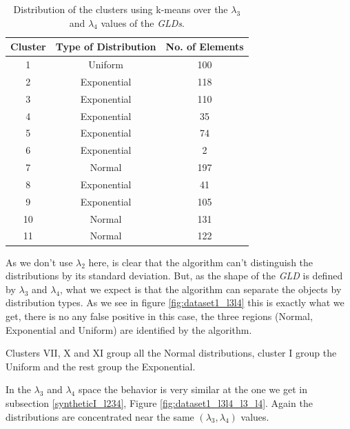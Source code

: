 \begin{table}[]
\centering
\caption{Distribution of the clusters using k-means over the $\lambda_{3}$ and $\lambda_{4}$ values of the \textit{GLDs}.}
\label{tab:dataset1_l3l4}
\begin{tabular}{|c|c|c|}
\hline
Cluster & Type of Distribution & No. of Elements \\ \hline
1       & Uniform          & 100              \\ \hline
2       & Exponential          & 118              \\ \hline
3       & Exponential          & 110             \\ \hline
4       & Exponential               & 35              \\ \hline
5       & Exponential               & 74              \\ \hline
6       & Exponential               & 2             \\ \hline
7       & Normal              & 197             \\ \hline
8       & Exponential          & 41              \\ \hline
9       & Exponential          & 105               \\ \hline
10      & Normal               & 131              \\ \hline
11      & Normal          & 122              \\ \hline
\end{tabular}
\end{table}
 
 
As we don't use $\lambda_{2}$ here, is clear that the algorithm can't distinguish the distributions by its standard deviation. But, as the shape of the \textit{GLD} is defined by $\lambda_{3}$ and $\lambda_{4}$, what we expect is that the algorithm can separate the objects by distribution types. As we see in figure \ref{fig:dataset1_l3l4} this is exactly what we get, there is no any false positive in this case, the three regions (Normal, Exponential and Uniform) are identified by the algorithm.

Clusters VII, X and XI group all the Normal distributions, cluster I group the Uniform and the rest group the Exponential.

In the $\lambda_{3}$ and $\lambda_{4}$ space the behavior is very similar at the one we get in subsection \ref{syntheticI_l234}, Figure \ref{fig:dataset1_l3l4_l3_l4}. Again the distributions are concentrated near the same $(\lambda_{3}, \lambda_{4})$ values.


